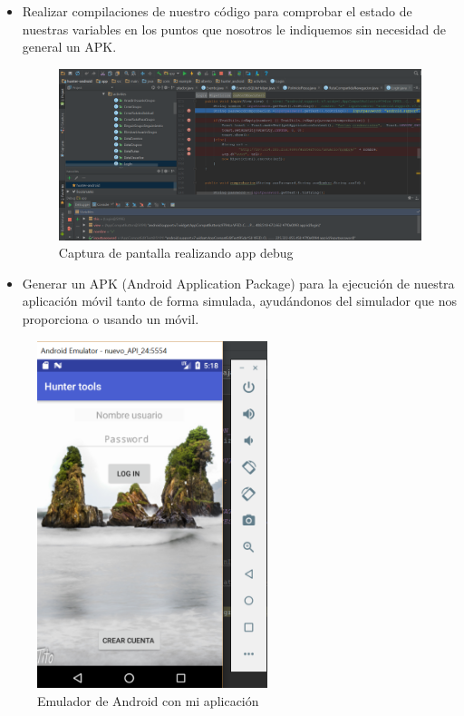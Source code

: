 \begin{itemize}
\item Realizar compilaciones  de nuestro código para comprobar el estado de nuestras variables en los puntos que nosotros le indiquemos sin necesidad de general un APK.
\begin{figure}
		\centering
		\includegraphics[width=\textwidth] {debug.png}
		\caption{Captura de pantalla realizando app debug }\label{fig:debug}
	\end{figure}

\item Generar un APK (Android Application Package) para la ejecución de nuestra aplicación móvil tanto de forma simulada, ayudándonos del simulador que nos proporciona o usando un móvil.
\end{itemize}
\begin{figure}
		\centering
		\includegraphics[width=0.6\textwidth] {emulador.png}
		\caption{Emulador de Android con mi aplicación}
		\label{fig:emulador}
	\end{figure}
 



